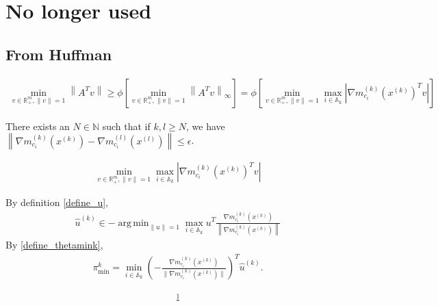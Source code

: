 \documentclass{article}
\theoremstyle{case}
\numberwithin{theorem}{subsection}
\DeclareMathOperator*{\argmin}{arg\,min}
\newcommand{\activeconstraintsk}{{\mathbb A_{k}}}
\newcommand{\gmcik}{{\nabla m_{c_i}^{(k)}\left(\xk\right)}}
\newcommand{\hgik}{{\frac{\nabla m^{(k)}_{c_i}(\xk)}{\|\nabla m^{(k)}_{c_i}\left(\xk\right)\|}}}
\newcommand{\huk}{{{\hat u}^{(k)}}}
\newcommand{\mcik}{{{m}^{(k)}_{c_i}}}
\newcommand{\mcil}{{{m}^{(l)}_{c_i}}}
\newcommand{\naturals}{\mathbb N}
\newcommand{\Rm}{\mathbb R^m}
\newcommand{\thetamink}{{\pi^k_{\textrm{min}}}}
\newcommand{\xk}{x^{(k)}}
\newcommand{\xl}{{x^{(l)}}}
\begin{document}
\section{No longer used}



\subsection{From Huffman}




\color{red}
\begin{align*}
\min_{v \in \Rm_+, \|v\| = 1} \left\|A^Tv\right\| 
\ge \phi \left[\min_{v \in \Rm_+, \|v\| = 1} \left\|A^Tv\right\|_{\infty}\right] 
=   \phi \left[\min_{v \in \Rm_+, \|v\| = 1} \max_{i \in \activeconstraintsk} \left|\gmcik^T v\right|\right]
\end{align*}



There exists an $N \in \naturals$ such that if $k, l \ge N$, we have $\left\|\nabla \mcik\left(\xk\right) - \nabla \mcil\left(\xl\right) \right\| \le \epsilon$.

\begin{align*}
\min_{v \in \Rm_+, \|v\| = 1} \max_{i \in \activeconstraintsk} \left|\gmcik^T v\right|
\end{align*}


By definition \cref{define_u},
\begin{align*}
\huk \in -\argmin_{\|u\| = 1} \max_{i \in \activeconstraintsk} u^T \frac{\gmcik}{\left\|\gmcik\right\|}
\end{align*}
By \cref{define_thetamink},
\begin{align*}
\thetamink = \min_{i \in \activeconstraintsk} \left(-\hgik\right)^T \huk.
\end{align*}



\begin{align*}
\frac 1 {}
\end{align*}
\color{black}
\end{document}
